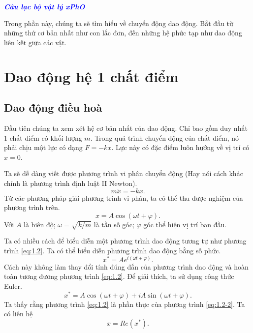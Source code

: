 \documentclass[12pt]{article}
\renewcommand{\normalcolor}{\color{wsdred}}
\begin{document}
{\fontsize{50}{24}
\LARGE \normalcolor{ \textbf{Dao động cơ học} } }

\textcolor{blue}{\textbf{\textit{Câu lạc bộ vật lý xPhO}}}
\vspace{3mm}

Trong phần này, chúng ta sẽ tìm hiểu về chuyển động dao động. Bắt đầu từ những thứ cơ bản nhất như con lắc đơn, đến những hệ phức tạp như dao động liên kết giữa các vật. 

\tableofcontents
\newpage


\section{Dao động hệ 1 chất điểm}
\subsection{Dao động điều hoà}
Đầu tiên chúng ta xem xét hệ cơ bản nhất của dao động. Chỉ bao gồm duy nhất 1 chất điểm có khối lượng \(m\). Trong quá trình chuyển động của chất điểm, nó phải chịu một lực có dạng \(F = - k x\). Lực này có đặc điểm luôn hướng về vị trí có \(x = 0\). 

\begin{figure}[!htb]
    \centering
    
    \caption{}
    \label{fig:1.1}
\end{figure}

Ta sẽ dễ dàng viết được phương trình vi phân chuyển động (Hay nói cách khác chính là phương trình định luật II Newton).
\begin{equation}
    m \ddot{x} = -kx.
    \label{eq:1.1}
\end{equation}
Từ các phương pháp giải phương trình vi phân, ta có thể thu được nghiệm của phương trình trên.
\begin{equation}
    x = A \cos{ \left(\omega t + \varphi \right)}.
    \label{eq:1.2}
\end{equation}
Với \(A\) là biên độ; \(\omega = \sqrt{k/m}\) là tần số góc; \(\varphi\) góc thể hiện vị trí ban đầu. 
\vspace{4mm}

Ta có nhiều cách để biểu diễn một phương trình dao động tương tự như phương trình \ref{eq:1.2}. Ta có thể biểu diễn phương trình dao động bằng số phức.
\begin{equation}
    x^* = A e^{i \left( \omega t + \varphi \right)}.
    \label{eq:1.2-2}
\end{equation}
Cách này không làm thay đổi tính đúng đắn của phương trình dao động và hoàn toàn tương đương phương trình \ref{eq:1.2}. Để giải thích, ta sử dụng công thức Euler.
\begin{equation*}
    x^* = A \cos{\left( \omega t + \varphi \right)} + i A \sin{\left( \omega t + \varphi \right)}.
\end{equation*}
Ta thấy rằng phương trình \ref{eq:1.2} là phần thực của phương trình \ref{eq:1.2-2}. Ta có liên hệ
\begin{equation}
    x = Re (x^*).
\end{equation}
\end{document}
